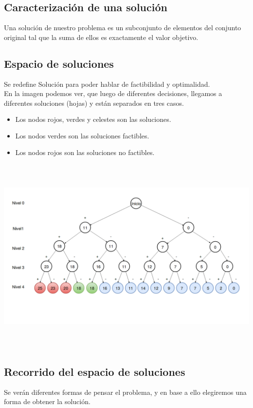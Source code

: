 \subsection{Caracterizaci\'on de una soluci\'on}
Una solución de nuestro problema es un subconjunto de elementos del conjunto original tal que la suma de ellos es exactamente el valor objetivo.\\
\subsection{Espacio de soluciones}
Se redefine Solución para poder hablar de factibilidad y optimalidad.\\
En la imagen podemos ver, que luego de diferentes decisiones, llegamos a diferentes soluciones (hojas) y est\'an separados en tres casos.
\begin{itemize}
	\item Los nodos rojos, verdes y celestes son las soluciones.
	\item Los nodos verdes son las soluciones factibles.
	\item Los nodos rojos son las soluciones no factibles. 
\end{itemize}	
\begin{center}
\includegraphics[width=18cm, height=10cm]{3casos.png}
\end{center}
\subsection{Recorrido del espacio de soluciones}
Se ver\'an diferentes formas de pensar el problema, y en base a ello elegiremos una forma de obtener la soluci\'on.\\

